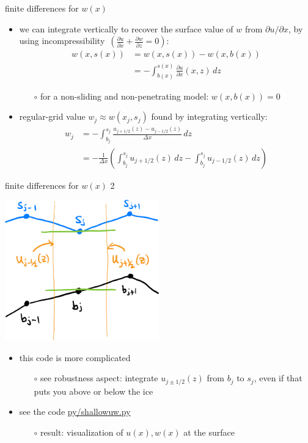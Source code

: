 \documentclass[10pt,dvipsnames]{beamer}
\begin{document}
\begin{frame}{finite differences for $w(x)$}

\begin{itemize}
\item we can integrate vertically to recover the surface value of $w$ from $\partial u/\partial x$, by \alert{using incompressibility} \,$\left(\frac{\partial u}{\partial x} + \frac{\partial w}{\partial z} = 0\right)$:
\begin{align*}
w(x,s(x)) &= w(x,s(x)) - w(x,b(x)) \\
   &= - \int_{b(x)}^{s(x)} \frac{\partial u}{\partial x}(x,z)\,dz
\end{align*}
  \begin{itemize}
  \item[$\circ$] for a non-sliding and non-penetrating model: $w(x,b(x))=0$
  \end{itemize}
\item regular-grid value $w_j \approx w(x_j,s_j)$ found by integrating vertically:
\begin{align*}
w_j &= - \int_{b_j}^{s_j} \frac{u_{j+1/2}(z) - u_{j-1/2}(z)}{\Delta x}\,dz \\
    &= - \frac{1}{\Delta x} \left(\int_{b_j}^{s_j} u_{j+1/2}(z)\,dz - \int_{b_j}^{s_j} u_{j-1/2}(z)\,dz\right)
\end{align*}
\end{itemize}
\end{frame}


\begin{frame}{finite differences for $w(x)$ 2}

\begin{center}
\includegraphics[width=0.5\textwidth]{staggeredw}
\end{center}

\begin{itemize}
\item this code is more complicated
  \begin{itemize}
  \item[$\circ$] see robustness aspect: integrate $u_{j\pm 1/2}(z)$ from $b_j$ to $s_j$, even if that puts you above or below the ice
  \end{itemize}
\item see the code \href{https://github.com/bueler/mccarthy/blob/master/py/shallowuw.py}{py/shallowuw.py}
  \begin{itemize}
  \item[$\circ$] result: visualization of $u(x),w(x)$ at the surface
  \end{itemize}
\end{itemize}
\end{frame}
\end{document}

